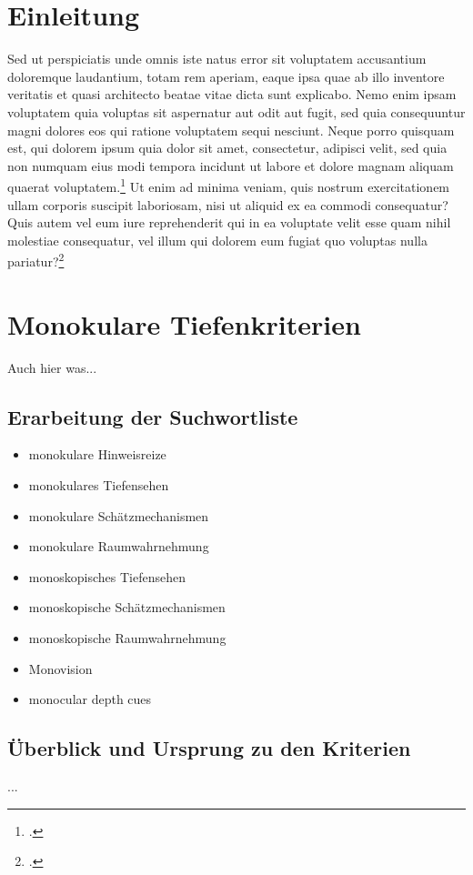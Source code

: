 \section{Einleitung}
Sed ut perspiciatis unde omnis iste natus error sit voluptatem accusantium doloremque laudantium, totam rem aperiam, eaque ipsa quae ab illo inventore veritatis et quasi architecto beatae vitae dicta sunt explicabo. Nemo enim ipsam voluptatem quia voluptas sit aspernatur aut odit aut fugit, sed quia consequuntur magni dolores eos qui ratione voluptatem sequi nesciunt. Neque porro quisquam est, qui dolorem ipsum quia dolor sit amet, consectetur, adipisci velit, sed quia non numquam eius modi tempora incidunt ut labore et dolore magnam aliquam quaerat voluptatem.\footcite[Vgl.][]{testOnline} Ut enim ad minima veniam, quis nostrum exercitationem ullam corporis suscipit laboriosam, nisi ut aliquid ex ea commodi consequatur? Quis autem vel eum iure reprehenderit qui in ea voluptate velit esse quam nihil molestiae consequatur, vel illum qui dolorem eum fugiat quo voluptas nulla pariatur?\footcite[Vgl.][S. 83]{testBuch}

\section{Monokulare Tiefenkriterien}
Auch hier was...

\subsection{Erarbeitung der Suchwortliste}
\begin{itemize}
\item monokulare Hinweisreize 
\item monokulares Tiefensehen
\item monokulare Schätzmechanismen
\item monokulare Raumwahrnehmung
\item monoskopisches Tiefensehen
\item monoskopische Schätzmechanismen
\item monoskopische Raumwahrnehmung
\item Monovision
\item monocular depth cues
\end{itemize}


\subsection{Überblick und Ursprung zu den Kriterien}
...

